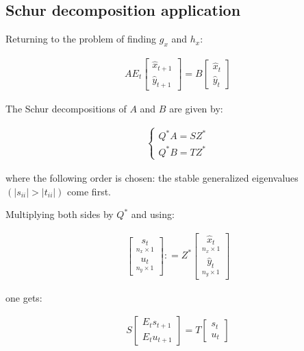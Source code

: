\documentclass{pracamgr}
\numberwithin{equation}{section}
\begin{document}
\subsection{Schur decomposition application}

Returning to the problem of finding $g_x$ and $h_x$:

\begin{eqnarray}
    A E_t \begin{bmatrix} \widehat{x}_{t+1} \\ \widehat{y}_{t+1} \end{bmatrix} = B\begin{bmatrix} \widehat{x}_t\\ \widehat{y}_t \end{bmatrix}
  \end{eqnarray}

The Schur decompositions of $A$ and $B$ are given by:

\begin{align}
\left\{
\begin{array}{cl}
Q^* A = S Z^* \\
Q^* B = T Z^*
\end{array}
\right.
\end{align}

where the following order is chosen: the stable generalized eigenvalues $(|s_{ii}|>|t_{ii}|)$ come first. 

Multiplying both sides by $Q^*$ and using:

\begin{align}
\begin{bmatrix} \underset{n_x \times 1}{s_t} \\ \underset{n_y\times1}{u_t} \end{bmatrix} : = Z^* \begin{bmatrix} \underset{n_x \times 1}{\widehat{x}_t} \\ \underset{n_y \times 1}{\widehat{y}_t} \end{bmatrix}\end{align}

one gets:

\begin{align}
  S  \begin{bmatrix} E_t s_{t+1}\\ E_t u_{t+1} \end{bmatrix} = T \begin{bmatrix} s_t \\ u_t \end{bmatrix}
\end{align}
\end{document}
